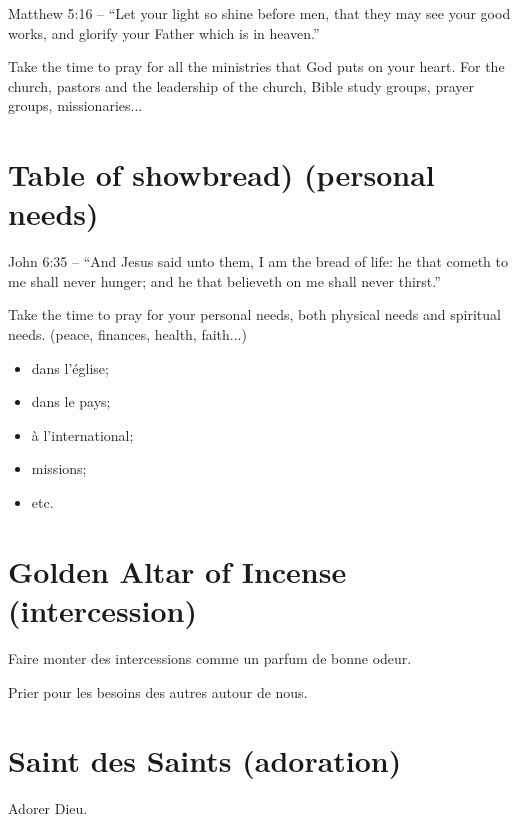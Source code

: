 Matthew 5:16 – “Let your light so shine before men, that they may see your good works, and glorify your Father which is in heaven.”

Take the time to pray for all the ministries that God puts on your heart. For the church, pastors and the leadership of the church, Bible study groups, prayer groups, missionaries... 
\section{Table of showbread) (personal needs)}

John 6:35 – “And Jesus said unto them, I am the bread of life: he that cometh to me shall never hunger; and he that believeth on me shall never thirst.”

Take the time to pray for your personal needs, both physical needs and spiritual needs. (peace, finances, health, faith...) 
\begin{itemize}
  \item dans l'église;
  \item dans le pays;
  \item à l'international;
  \item missions;
  \item etc.
\end{itemize}


\section{Golden Altar of Incense (intercession)}

Faire monter des intercessions comme un parfum de bonne odeur.

Prier pour les besoins des autres autour de nous.



\section{Saint des Saints (adoration)}

Adorer Dieu.
